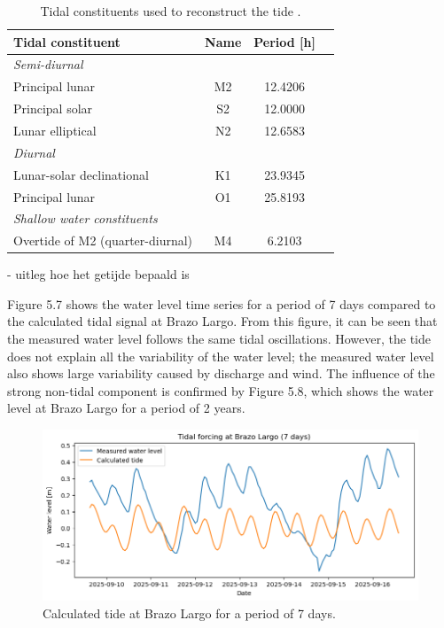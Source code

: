 \begin{table}[h!]
\centering
\caption{Tidal constituents used to reconstruct the tide
\autocite{BRON}.}
\label{tab:constituents}
\begin{tabular}{lccc}
\hline
\textbf{Tidal constituent} & \textbf{Name} & \textbf{Period [h]} \\
\hline
\multicolumn{3}{l}{\textit{Semi-diurnal}} \\
\hspace{1em}Principal lunar & M2 & 12.4206\\
\hspace{1em}Principal solar & S2 & 12.0000 \\
\hspace{1em}Lunar elliptical & N2 & 12.6583\\
\hline
\multicolumn{3}{l}{\textit{Diurnal}} \\
\hspace{1em}Lunar-solar declinational & K1 & 23.9345  \\
\hspace{1em}Principal lunar & O1 & 25.8193  \\
\hline
\multicolumn{3}{l}{\textit{Shallow water constituents}} \\
\hspace{1em}Overtide of M2 (quarter-diurnal) & M4 & 6.2103  \\
\hline
\end{tabular}
\end{table}

- uitleg hoe het getijde bepaald is

Figure 5.7 shows the water level time series for a period of 7 days compared to the calculated tidal signal at Brazo Largo. From this figure, it can be seen that the measured water level follows the same tidal oscillations. However, the tide does not explain all the variability of the water level; the measured water level also shows large variability caused by discharge and wind. The influence of the strong non-tidal component is confirmed by Figure 5.8, which shows the water level at Brazo Largo for a period of 2 years.

\begin{figure}[H]
    \centering
    \includegraphics[width=1\linewidth]{figures/ch5/Tide_Brazo_largo.png}
    \caption{Calculated tide at Brazo Largo for a period of 7 days.}
    \label{fig:placeholder}
\end{figure}

